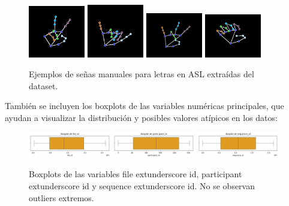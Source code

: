 \documentclass[12pt]{article}
\begin{document}
\begin{figure}[h]
    \centering
    \includegraphics[width=0.22\textwidth]{Mano1.png}
    \includegraphics[width=0.22\textwidth]{Mano2.png}
    \includegraphics[width=0.22\textwidth]{Mano3.png}
    \includegraphics[width=0.22\textwidth]{Mano4.png}
    \caption{Ejemplos de señas manuales para letras en ASL extraídas del dataset.}
    \label{fig:manos_asl}
\end{figure}

También se incluyen los boxplots de las variables numéricas principales, que ayudan a visualizar la distribución y posibles valores atípicos en los datos:

\begin{figure}[h]
    \centering
    \includegraphics[width=0.32\textwidth]{Box_fiel.png}
    \includegraphics[width=0.32\textwidth]{Box_participant.png}
    \includegraphics[width=0.32\textwidth]{Box_sequence.png}
    \caption{Boxplots de las variables file	extunderscore id, participant	extunderscore id y sequence	extunderscore id. No se observan outliers extremos.}
    \label{fig:boxplots}
\end{figure}
\end{document}
